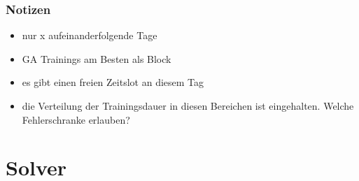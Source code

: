     
    \subsubsection{Notizen}
        \begin{itemize}
            \item nur x aufeinanderfolgende Tage
            \item GA Trainings am Besten als Block \cite[34]{Radsporttraining}
            \item es gibt einen freien Zeitslot an diesem Tag
            \item die Verteilung der Trainingsdauer in diesen Bereichen ist eingehalten. Welche Fehlerschranke erlauben?
        \end{itemize}
\section{Solver}
    